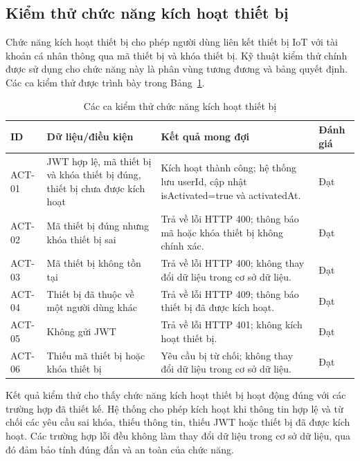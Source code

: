 \documentclass[../DoAn.tex]{subfiles}
\begin{document}
\subsection{Kiểm thử chức năng kích hoạt thiết bị}

Chức năng kích hoạt thiết bị cho phép người dùng liên kết thiết bị IoT với tài khoản cá nhân thông qua mã thiết bị và khóa thiết bị. Kỹ thuật kiểm thử chính được sử dụng cho chức năng này là phân vùng tương đương và bảng quyết định. Các ca kiểm thử được trình bày trong Bảng~\ref{tab:test-case-activation}.

\begin{table}[H]
\centering
\renewcommand{\arraystretch}{1.3}
\begin{tabular}{|p{}|p{}|p{}|p{}|}
\hline
\textbf{ID} & \textbf{Dữ liệu/điều kiện} & \textbf{Kết quả mong đợi} & \textbf{Đánh giá} \\ \hline
ACT-01 & JWT hợp lệ, mã thiết bị và khóa thiết bị đúng, thiết bị chưa được kích hoạt & Kích hoạt thành công; hệ thống lưu userId, cập nhật isActivated=true và activatedAt. & Đạt \\ \hline
ACT-02 & Mã thiết bị đúng nhưng khóa thiết bị sai & Trả về lỗi HTTP 400; thông báo mã hoặc khóa thiết bị không chính xác. & Đạt \\ \hline
ACT-03 & Mã thiết bị không tồn tại & Trả về lỗi HTTP 400; không thay đổi dữ liệu trong cơ sở dữ liệu. & Đạt \\ \hline
ACT-04 & Thiết bị đã thuộc về một người dùng khác & Trả về lỗi HTTP 409; thông báo thiết bị đã được kích hoạt. & Đạt \\ \hline
ACT-05 & Không gửi JWT & Trả về lỗi HTTP 401; không kích hoạt thiết bị. & Đạt \\ \hline
ACT-06 & Thiếu mã thiết bị hoặc khóa thiết bị & Yêu cầu bị từ chối; không thay đổi dữ liệu trong cơ sở dữ liệu. & Đạt \\ \hline
\end{tabular}
\caption{Các ca kiểm thử chức năng kích hoạt thiết bị}
\label{tab:test-case-activation}
\end{table}


Kết quả kiểm thử cho thấy chức năng kích hoạt thiết bị hoạt động đúng với các trường hợp đã thiết kế. Hệ thống cho phép kích hoạt khi thông tin hợp lệ và từ chối các yêu cầu sai khóa, thiếu thông tin, thiếu JWT hoặc thiết bị đã được kích hoạt. Các trường hợp lỗi đều không làm thay đổi dữ liệu trong cơ sở dữ liệu, qua đó đảm bảo tính đúng đắn và an toàn của chức năng.
\end{document}
